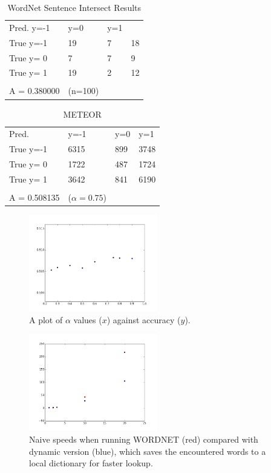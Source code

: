 \documentclass{article}
\begin{document}

\begin{table}[tbp]
\centering
\caption{WordNet Sentence Intersect Results}
\label{t1}
\begin{tabular}{llll}
Pred. y=-1          & y=0 & y=1 &    \\
True y=-1           & 19  & 7   & 18 \\
True y= 0           & 7   & 7   & 9  \\
True y= 1           & 19  & 2   & 12 \\
                    &     &     &    \\
A = 0.380000 &  (n=100)     &     &
\end{tabular}
\end{table}

\begin{table}[tbp]
\centering
\caption{METEOR}
\label{t2}
\begin{tabular}{llll}
Pred.               & y=-1 & y=0 & y=1  \\
True y=-1           & 6315 & 899 & 3748 \\
True y= 0           & 1722 & 487 & 1724 \\
True y= 1           & 3642 & 841 & 6190 \\
                    &      &     &      \\
A = 0.508135 & ($\alpha=0.75$)     &     &
\end{tabular}
\end{table}

\begin{figure}[ht]
\caption{A plot of $\alpha$ values ($x$) against accuracy ($y$).}
\label{fig:meteoralpha}
\centering
\includegraphics[width=0.5\textwidth]{figure_1}
\end{figure}

\begin{figure}[ht]
\caption{Naive speeds when running WORDNET (red) compared with dynamic version (blue), which saves the encountered words to a local dictionary for faster lookup.}
\label{fig:dynamic}
\centering
\includegraphics[width=0.5\textwidth]{figure_2}
\end{figure}
\end{document}
